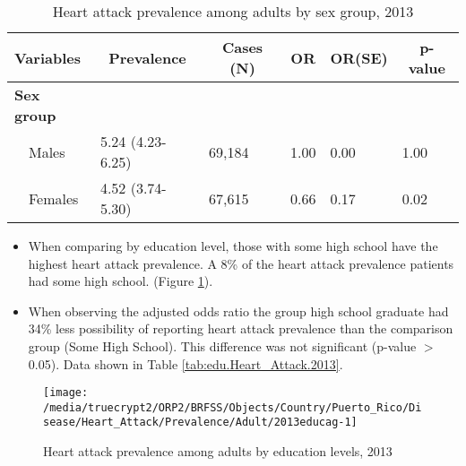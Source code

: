 \begin{table}[H]
\caption{Heart attack prevalence  among adults by sex group, 2013\label{tab:sex.Heart_Attack.2013}} 
\begin{center}
\begin{tabular}{llllll}
\hline\hline
\multicolumn{1}{l}{Variables}&\multicolumn{1}{c}{Prevalence}&\multicolumn{1}{c}{Cases (N)}&\multicolumn{1}{c}{OR}&\multicolumn{1}{c}{OR(SE)}&\multicolumn{1}{c}{p-value}\tabularnewline
\hline
{\bfseries Sex group}&&&&&\tabularnewline
~~Males&5.24 (4.23-6.25)&69,184&1.00&0.00&1.00\tabularnewline
~~Females&4.52 (3.74-5.30)&67,615&0.66&0.17&0.02\tabularnewline
\hline
\end{tabular}\end{center}

\end{table}


\newpage
\begin{itemize}

\item When comparing by education level, those with
some high school
have the highest heart attack prevalence. A 8\% of the heart attack prevalence patients had some high school.
(Figure \ref{fig:edu.Heart_Attack.2013}).

\item 
When observing the adjusted odds ratio the group high school graduate had 34\% less possibility of reporting heart attack prevalence than the comparison group (Some High School).
This difference was not significant (p-value $>$ 0.05).  Data shown in Table \ref{tab:edu.Heart_Attack.2013}.

\end{itemize}

\begin{figure}[H]
\caption{Heart attack prevalence among adults by education levels, 
         2013}
\begin{knitrout}
\color{fgcolor}

{\centering \texttt{[image: /media/truecrypt2/ORP2/BRFSS/Objects/Country/Puerto\_Rico/Disease/Heart\_Attack/Prevalence/Adult/2013educag-1]} 

}



\end{knitrout}
 \label{fig:edu.Heart_Attack.2013}
\end{figure}

